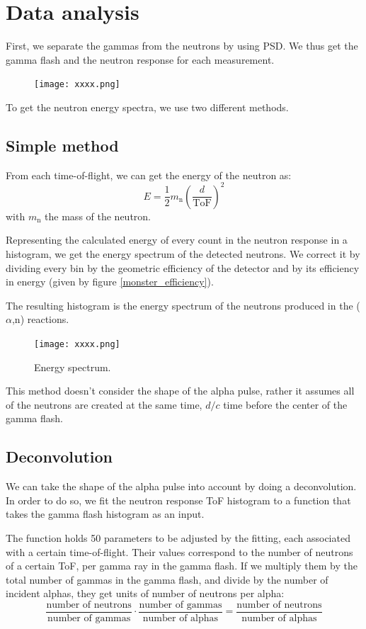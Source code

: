\documentclass[a4paper,12pt]{report}
\newcommand{\an}{($\alpha$,n) }
\begin{document}
\section{Data analysis}
First, we separate the gammas from the neutrons by using PSD.
We thus get the gamma flash and the neutron response for each measurement.

\begin{figure}[H]
	\centering
	\texttt{[image: xxxx.png]}
	\caption{}
	\label{}
\end{figure}

To get the neutron energy spectra, we use two different methods.

\subsection{Simple method}
From each time-of-flight, we can get the energy of the neutron as:
\begin{equation}
	E=\frac{1}{2} m_\text{n} \left( \frac{d}{\text{ToF}} \right)^2
\end{equation}
with $m_\text{n}$ the mass of the neutron.

Representing the calculated energy of every count in the neutron response in a histogram, we get the energy spectrum of the detected neutrons.
We correct it by dividing every bin by the geometric efficiency of the detector and by its efficiency in energy (given by figure \ref{monster_efficiency}).

The resulting histogram is the energy spectrum of the neutrons produced in the \an reactions.
\\

\begin{figure}[H]
	\centering
	\texttt{[image: xxxx.png]}
	\caption{Energy spectrum.}
	\label{}
\end{figure}

This method doesn't consider the shape of the alpha pulse, rather it assumes all of the neutrons are created at the same time, $d/c$ time before the center of the gamma flash.

\subsection{Deconvolution}
We can take the shape of the alpha pulse into account by doing a deconvolution.
In order to do so, we fit the neutron response ToF histogram to a function that takes the gamma flash histogram as an input.

The function holds 50 parameters to be adjusted by the fitting, each associated with a certain time-of-flight.
Their values correspond to the number of neutrons of a certain ToF, per gamma ray in the gamma flash.
If we multiply them by the total number of gammas in the gamma flash, and divide by the number of incident alphas, they get units of number of neutrons per alpha:
\begin{equation}
	\frac{\text{number of neutrons}}{\text{number of gammas}}\cdot \frac{\text{number of gammas}}{\text{number of alphas}} = \frac{\text{number of neutrons}}{\text{number of alphas}}
\end{equation}
\end{document}

